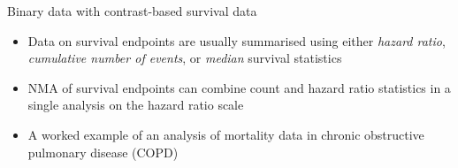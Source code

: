 \documentclass[
  ignorenonframetext,
]{beamer}
\providecommand{\tightlist}{%
  \setlength{\itemsep}{0pt}\setlength{\parskip}{0pt}}\usepackage{longtable,booktabs,array}
\begin{document}
\begin{frame}{Binary data with contrast-based survival data}
\protect\hypertarget{binary-data-with-contrast-based-survival-data}{}

\pause

\begin{itemize}
\tightlist
\item
  Data on survival endpoints are usually summarised using either
  \emph{hazard ratio}, \emph{cumulative number of events}, or
  \emph{median} survival statistics
\end{itemize}

\pause

\begin{itemize}
\tightlist
\item
  NMA of survival endpoints can combine count and hazard ratio
  statistics in a single analysis on the hazard ratio scale
\end{itemize}

\pause

\begin{itemize}
\tightlist
\item
  A worked example of an analysis of mortality data in chronic
  obstructive pulmonary disease (COPD)
\end{itemize}

\marginnote{\begin{footnotesize}

\end{footnotesize}}
\end{frame}
\end{document}
